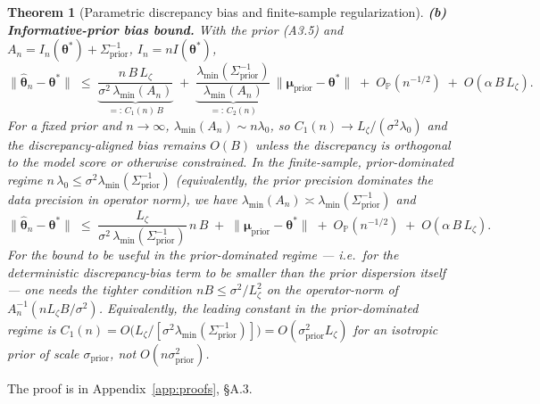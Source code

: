 \documentclass[12pt]{article}
\theoremstyle{plain}
\newtheorem{theorem}{Theorem}
\theoremstyle{definition}
\theoremstyle{remark}
\newcommand{\norm}[1]{\lVert #1 \rVert}
\begin{document}
\begin{theorem}[Parametric discrepancy bias and finite-sample regularization]
\textbf{(b) Informative-prior bias bound.}  With the prior (A3.5) and
$A_n=I_n(\boldsymbol\theta^*)+\Sigma_{\mathrm{prior}}^{-1}$,
$I_n=n I(\boldsymbol\theta^*)$,
\begin{equation}\label{eq:bias_bound}
   \norm{\hat{\boldsymbol\theta}_n-\boldsymbol\theta^*}
   \;\le\;
   \underbrace{\frac{n\,B\,L_\zeta}{\sigma^2\,\lambda_{\min}(A_n)}}_{=:\,C_1(n)\,B}
   \;+\;
   \underbrace{\frac{\lambda_{\min}(\Sigma_{\mathrm{prior}}^{-1})}{\lambda_{\min}(A_n)}}_{=:\,C_2(n)}\,
       \norm{\boldsymbol\mu_{\mathrm{prior}}-\boldsymbol\theta^*}
   \;+\; O_{\mathbb{P}}(n^{-1/2})
   \;+\; O(\alpha\,B\,L_\zeta).
\end{equation}
For a fixed prior and $n\to\infty$, $\lambda_{\min}(A_n)\sim n\lambda_0$,
so $C_1(n)\to L_\zeta/(\sigma^2\lambda_0)$ and the discrepancy-aligned bias
remains $O(B)$ unless the discrepancy is orthogonal to the model score or
otherwise constrained.  In the finite-sample, prior-dominated regime
$n\,\lambda_0\le\sigma^2\lambda_{\min}(\Sigma_{\mathrm{prior}}^{-1})$
(equivalently, the prior precision dominates the data precision in operator
norm), we have $\lambda_{\min}(A_n)\asymp
\lambda_{\min}(\Sigma_{\mathrm{prior}}^{-1})$ and
\begin{equation}\label{eq:bias_bound_specialized}
  \norm{\hat{\boldsymbol\theta}_n-\boldsymbol\theta^*}
   \;\le\;\frac{L_\zeta}{\sigma^2\,\lambda_{\min}(\Sigma_{\mathrm{prior}}^{-1})}\,
            n\,B
        \;+\;\norm{\boldsymbol\mu_{\mathrm{prior}}-\boldsymbol\theta^*}
   \;+\; O_{\mathbb{P}}(n^{-1/2})
   \;+\; O(\alpha\,B\,L_\zeta).
\end{equation}
For the bound to be useful in the prior-dominated regime --- i.e.\ for the
deterministic discrepancy-bias term to be smaller than the prior dispersion
itself --- one needs the tighter condition
$n B\le\sigma^2 / L_\zeta^2$ on the operator-norm of
$A_n^{-1}(n L_\zeta B/\sigma^2)$.  Equivalently, the leading constant in
the prior-dominated regime is
$C_1(n) = O\!\bigl(L_\zeta /
[\sigma^2\lambda_{\min}(\Sigma_{\mathrm{prior}}^{-1})]\bigr) =
O(\sigma_{\mathrm{prior}}^2 L_\zeta)$ for an isotropic prior of scale
$\sigma_{\mathrm{prior}}$, not $O(n\sigma_{\mathrm{prior}}^2)$.
\end{theorem}

The proof is in Appendix~\ref{app:proofs}, \S A.3.
\end{document}
